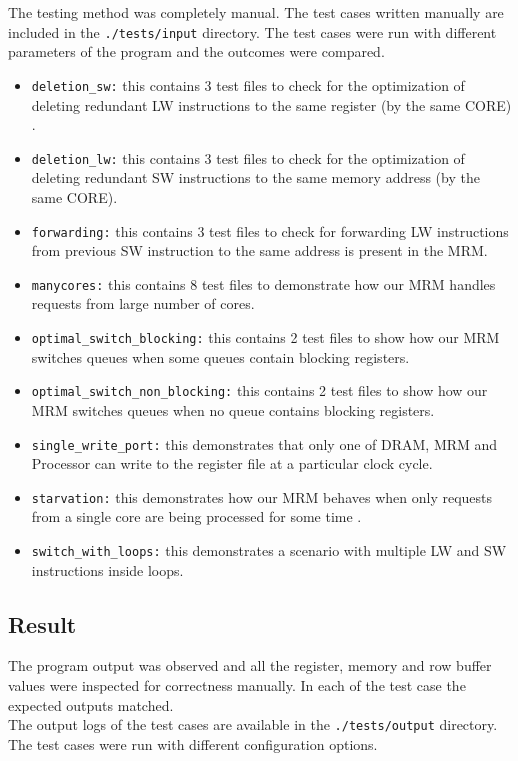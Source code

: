 \documentclass[hidelinks,12pt]{article}
\begin{document}
The testing method was completely manual. The test cases written manually are included in the \verb|./tests/input| directory. The test cases were run with different parameters
of the program and the outcomes were compared.
\begin{itemize}
    \item \verb|deletion_sw:| this contains 3 test files to check for the optimization of deleting redundant LW instructions to the same register (by the same CORE) .
    \item \verb|deletion_lw:| this contains 3 test files to check for the optimization of deleting redundant SW instructions to the same memory address (by the same CORE).
    \item \verb|forwarding:| this contains 3 test files to check for forwarding LW instructions from previous SW instruction to the same address is present in the MRM.
    \item \verb|manycores:| this contains 8 test files to demonstrate how our MRM handles requests from large number of cores.
    \item \verb|optimal_switch_blocking:| this contains 2 test files to show how our MRM switches queues when some queues contain blocking registers.
    \item \verb|optimal_switch_non_blocking:| this contains 2 test files to show how our MRM switches queues when no queue contains blocking registers.
    \item \verb|single_write_port:| this demonstrates that only one of DRAM, MRM and Processor can write to the register file at a particular clock cycle.
    \item \verb|starvation:| this demonstrates how our MRM behaves when only requests from a single core are being processed for some time  .
    \item \verb|switch_with_loops:| this demonstrates a scenario with multiple LW and SW instructions inside loops.
\end{itemize}

\subsection{Result}
The program output was observed and all the register, memory and row buffer values were inspected for correctness manually. In each of the test case the expected outputs matched.\\[0.2cm]
The output logs of the test cases are available in the \verb|./tests/output| directory. The test cases were run with different configuration options.
\end{document}
